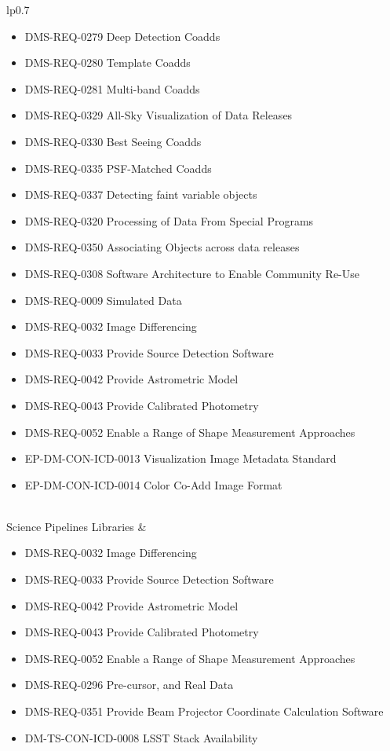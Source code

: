 \begin{xtabular}{lp{0.7\textwidth}}
\begin{itemize}
\item DMS-REQ-0279 Deep Detection Coadds
\item DMS-REQ-0280 Template Coadds
\item DMS-REQ-0281 Multi-band Coadds
\item DMS-REQ-0329 All-Sky Visualization of Data Releases
\item DMS-REQ-0330 Best Seeing Coadds
\item DMS-REQ-0335 PSF-Matched Coadds
\item DMS-REQ-0337 Detecting faint variable objects
\item DMS-REQ-0320 Processing of Data From Special Programs
\item DMS-REQ-0350 Associating Objects across data releases
\item DMS-REQ-0308 Software Architecture to Enable Community Re-Use
\item DMS-REQ-0009 Simulated Data
\item DMS-REQ-0032 Image Differencing
\item DMS-REQ-0033 Provide Source Detection Software
\item DMS-REQ-0042 Provide Astrometric Model
\item DMS-REQ-0043 Provide Calibrated Photometry
\item DMS-REQ-0052 Enable a Range of Shape Measurement Approaches
\item EP-DM-CON-ICD-0013 Visualization Image Metadata Standard
\item EP-DM-CON-ICD-0014 Color Co-Add Image Format
\end{itemize} \\ \hline
Science Pipelines Libraries &
\begin{itemize}DMS-REQ-0308 Software Architecture to Enable Community Re-Use
\item DMS-REQ-0032 Image Differencing
\item DMS-REQ-0033 Provide Source Detection Software
\item DMS-REQ-0042 Provide Astrometric Model
\item DMS-REQ-0043 Provide Calibrated Photometry
\item DMS-REQ-0052 Enable a Range of Shape Measurement Approaches
\item DMS-REQ-0296 Pre-cursor, and Real Data
\item DMS-REQ-0351 Provide Beam Projector Coordinate Calculation Software
\item DM-TS-CON-ICD-0008 LSST Stack Availability
\end{itemize} \\ \hline

\end{xtabular}
